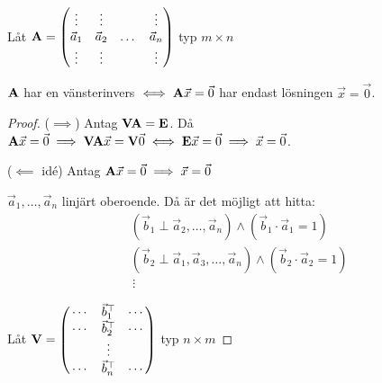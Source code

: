 
Låt $\mathbf{A}=\qty(\begin{matrix}
	\vdots&\vdots&&\vdots\\
	\vec{a}_1&\vec{a}_2&\dots&\vec{a}_n\\
	\vdots&\vdots&&\vdots
\end{matrix})$ typ $m\times n$

\begin{lemma}
	$\mathbf{A}$ har en vänsterinvers $\iff\mathbf{A}\vec{x}=\vec{0}$ har endast lösningen
	$\vec{x}=\vec{0}$.

	\begin{proof}
		($\implies$) Antag $\mathbf{V}\mathbf{A}=\mathbf{E}$. Då $\mathbf{A}\vec{x}=\vec{0}\implies
		\mathbf{V}\mathbf{A}\vec{x}=\mathbf{V}\vec{0}\iff\mathbf{E}\vec{x}=\vec{0}\implies\vec{x}=\vec{0}$.

		($\impliedby$ idé) Antag $\mathbf{A}\vec{x}=\vec{0}\implies\vec{x}=\vec{0}$
		
		$\vec{a}_1,\dots,\vec{a}_n$ linjärt oberoende. Då är det möjligt att hitta:
		\begin{align*}
			&(\vec{b}_1\perp\vec{a}_2,\dots,\vec{a}_n)\wedge(\vec{b}_1\cdot\vec{a}_1=1)\\
			&(\vec{b}_2\perp\vec{a}_1,\vec{a}_3,\dots,\vec{a}_n)\wedge(\vec{b}_2\cdot\vec{a}_2=1)\\
			&\,\vdots
		\end{align*}
	
		Låt $\mathbf{V}=\qty(\begin{matrix}
			\,\cdots&\vec{b}_1^\top&\cdots\,\\
			\,\cdots&\vec{b}_2^\top&\cdots\,\\
			&\vdots&\\
			\,\cdots&\vec{b}_n^\top&\cdots\,\\
		\end{matrix})$ typ $n\times m$


\end{proof}
\end{lemma}
